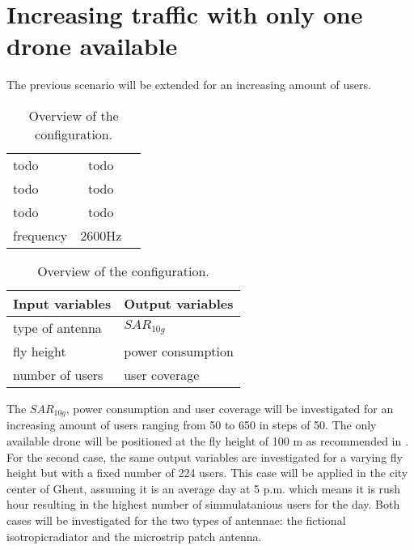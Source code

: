 \section{Increasing traffic with only one drone available}
The previous scenario will be extended for an increasing amount of users. 

\begin{table}[!htb]
    \begin{minipage}{.5\linewidth}
      \centering
        \begin{tabular}{|l|c|l|}
        \hline
        todo               & todo        \\    
        todo               & todo\\ 
        todo               & todo                     \\ 
        frequency                      & 2600Hz                   \\ 
        \hline
        \end{tabular}
    \end{minipage}%
    \begin{minipage}{.5\linewidth}
      \centering
            \begin{tabular}{|l|l|}
            \hline
            Input variables                & Output variables          \\   \hline 
            type of antenna                & $SAR_{10g}$               \\ 
            fly height                     & power consumption             \\ 
            number of users                & user coverage            \\ 
            \hline
            \end{tabular}
    \end{minipage} 
        \caption{Overview of the configuration.}
        \label{table:confOverviewScenario2}
\end{table}

The $SAR_{10g}$, power consumption and user coverage will be investigated for an increasing amount of users ranging from 50 to 650 in steps of 50.
The only available drone will be positioned at the fly height of 100 m as recommended in \cite{J2}. For the second case, the same output variables are investigated 
for a varying fly height but with a fixed number of 224 users. This case will be applied in the city center of Ghent, assuming it is an average 
day at 5 p.m. which means it is rush hour resulting in the highest number of simmulatanious users for the day\cite{J2}. 
Both cases will be investigated for the two types of antennae: the fictional \gls{isotropicradiator} and the microstrip patch antenna.



